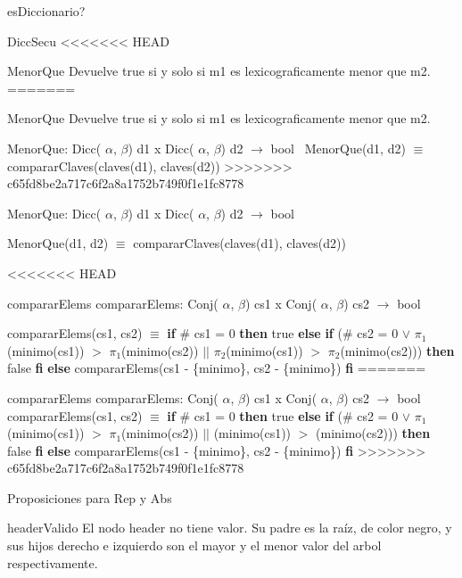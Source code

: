 \begin{DoxyParagraph}{es\-Diccionario?}
\begin{DoxyParagraph}{\-Dicc\-Secu}
<<<<<<< HEAD
\begin{DoxyParagraph}{\-Menor\-Que}
\-Devuelve true si y solo si m1 es lexicograficamente menor que m2.
=======

\begin{DoxyParagraph}{Menor\+Que}
Devuelve true si y solo si m1 es lexicograficamente menor que m2.

Menor\+Que\+: Dicc( $\alpha$, $\beta$) d1 x Dicc( $\alpha$, $\beta$) d2 $\to$ bool~\newline
Menor\+Que(d1, d2) $\equiv$ comparar\+Claves(claves(d1), claves(d2)) 
>>>>>>> c65fd8be2a717c6f2a8a1752b749f0f1e1fc8778
\end{DoxyParagraph}
\-Menor\-Que\-: \-Dicc( $\alpha$, $\beta$) d1 x \-Dicc( $\alpha$, $\beta$) d2 $\to$ bool\par
 \-Menor\-Que(d1, d2) $\equiv$ comparar\-Claves(claves(d1), claves(d2)) 

<<<<<<< HEAD
\begin{DoxyParagraph}{comparar\-Elems}
comparar\-Elems\-: \-Conj( $\alpha$, $\beta$) cs1 x \-Conj( $\alpha$, $\beta$) cs2 $\to$ bool\par
 comparar\-Elems(cs1, cs2) $\equiv$ {\bfseries if} \# cs1 = 0 {\bfseries then} true {\bfseries else} {\bfseries if} (\# cs2 = 0 $\lor$ $\pi_1$(minimo(cs1)) $>$ $\pi_1$(minimo(cs2)) $|$$|$ $\pi_2$(minimo(cs1)) $>$ $\pi_2$(minimo(cs2))) {\bfseries then} false {\bfseries fi} {\bfseries else} comparar\-Elems(cs1 -\/ \{minimo\}, cs2 -\/ \{minimo\}) {\bfseries fi} 
=======

\begin{DoxyParagraph}{comparar\+Elems}
comparar\+Elems\+: Conj( $\alpha$, $\beta$) cs1 x Conj( $\alpha$, $\beta$) cs2 $\to$ bool~\newline
comparar\+Elems(cs1, cs2) $\equiv$ {\bfseries if} \# cs1 = 0 {\bfseries then} true {\bfseries else} {\bfseries if} (\# cs2 = 0 $\lor$ $\pi_1$(minimo(cs1)) $>$ $\pi_1$(minimo(cs2)) $\vert$$\vert$ (minimo(cs1)) $>$ (minimo(cs2))) {\bfseries then} false {\bfseries fi} {\bfseries else} comparar\+Elems(cs1 -\/ \{minimo\}, cs2 -\/ \{minimo\}) {\bfseries fi} 
>>>>>>> c65fd8be2a717c6f2a8a1752b749f0f1e1fc8778
\end{DoxyParagraph}
\-Proposiciones para \-Rep y \-Abs

\begin{DoxyParagraph}{header\-Valido}
\-El nodo header no tiene valor. \-Su padre es la raíz, de color negro, y sus hijos derecho e izquierdo son el mayor y el menor valor del arbol respectivamente.\par


\end{DoxyParagraph}
\end{DoxyParagraph}
\end{DoxyParagraph}
\end{DoxyParagraph}
\end{DoxyParagraph}
